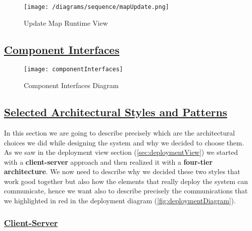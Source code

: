 		\begin{figure}[h!]
			\centering
			\texttt{[image: /diagrams/sequence/mapUpdate.png]}
			\caption{\label{fig:mapUpdateRuntime} Update Map Runtime View}
		\end{figure}
						
	
	\subsection[Component Interfaces]{\hyperlink{toc}{Component Interfaces}}
		\label{sec:componentInterfaces}
		
		\newpage
		
		\begin{figure}[hbtp]
			\centering
			\texttt{[image: componentInterfaces]}
			\caption{\label{fig:componentInterfaces} Component Interfaces Diagram}
		\end{figure}
	
		\FloatBarrier
		
	\subsection[Selected Architectural Styles and Patterns]{\hyperlink{toc}{Selected Architectural Styles and Patterns}}
		\label{sec:selectedArchitecturalStylesAndPatterns}
		
		In this section we are going to describe precisely which are the architectural choices we did while designing the system and why we decided to choose them. As we saw in the deployment view section (\ref{sec:deploymentView}) we started with a \textbf{client-server} approach and then realized it with a \textbf{four-tier architecture}. We now need to describe why we decided these two styles that work good together but also how the elements that really deploy the system can communicate, hence we want also to describe precisely the communications that we highlighted in red in the deployment diagram (\autoref{fig:deploymentDiagram}).
		
		\subsubsection[Client-Server]{\hyperlink{toc}{Client-Server}}
			\label{sec:clientServerDecision}
			

